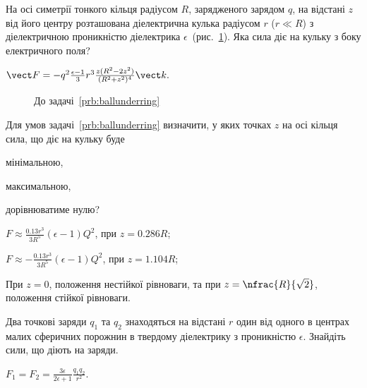 \begin{problem}\label{prb:ballunderring}
На осі симетрії тонкого кільця радіусом $R$, зарядженого зарядом $q$, на відстані $z$ від його центру розташована діелектрична кулька радіусом $r$ ($r \ll R$) з діелектричною проникністю діелектрика $\epsilon$~(рис.~\ref{ballunderring}). Яка сила діє на кульку з боку електричного поля?
\begin{solution}
	$\vect F = - q^2\frac{\epsilon - 1}{3}r^3 \frac{z(R^2 - 2z^2)}{(R^2 + z^2)^4} \vect k.$
\end{solution}
\end{problem}
\begin{figure}[h!]\centering
	\caption{До задачі~\ref{prb:ballunderring}}
	\label{ballunderring}
\end{figure}

\begin{problem}%
Для умов задачі~\ref{prb:ballunderring} визначити, у яких точках $z$ на осі кільця сила, що діє на кульку буде
\begin{enumerate*}[label=\alph*)]
	\item мінімальною,
	\item максимальною,
	\item дорівнюватиме нулю?
\end{enumerate*}
\begin{solution}
	\begin{enumerate*}[label=\alph*)]
		\item $F \approx \frac{0.13r^3}{3R^5} (\epsilon - 1) Q^2$, при $z = 0.286 R$;
		\item $F \approx - \frac{0.13r^3}{3R^5} (\epsilon - 1) Q^2$, при $z = 1.104 R$;
		\item При $z = 0$, положення нестійкої рівноваги, та при $z = \nfrac{R}{\sqrt2}$, положення стійкої рівноваги.
	\end{enumerate*}
\end{solution}
\end{problem}

\begin{problem}%
    Два точкові заряди $q_1$ та $q_2$ знаходяться на відстані $r$ один від одного в центрах малих сферичних порожнин в твердому діелектрику з проникністю $\epsilon$. Знайдіть сили, що діють на заряди.
\begin{solution}
	$F_1 = F_2 = \frac{3\epsilon}{2\epsilon + 1}\frac{q_1q_2}{r^2}$.
\end{solution}
\end{problem}



